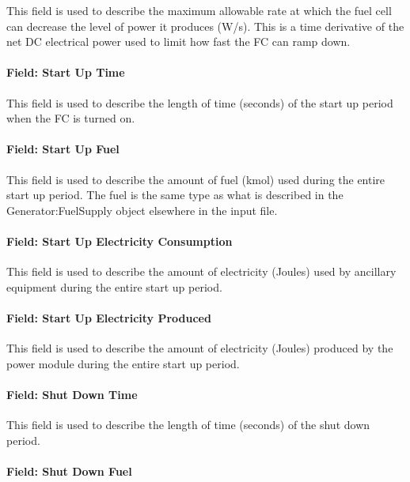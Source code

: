 This field is used to describe the maximum allowable rate at which the fuel cell can decrease the level of power it produces (W/s). This is a time derivative of the net DC electrical power used to limit how fast the FC can ramp down.

\paragraph{Field: Start Up Time}\label{field-start-up-time}

This field is used to describe the length of time (seconds) of the start up period when the FC is turned on.

\paragraph{Field: Start Up Fuel}\label{field-start-up-fuel}

This field is used to describe the amount of fuel (kmol) used during the entire start up period. The fuel is the same type as what is described in the Generator:FuelSupply object elsewhere in the input file.

\paragraph{Field: Start Up Electricity Consumption}\label{field-start-up-electricity-consumption}

This field is used to describe the amount of electricity (Joules) used by ancillary equipment during the entire start up period.

\paragraph{Field: Start Up Electricity Produced}\label{field-start-up-electricity-produced}

This field is used to describe the amount of electricity (Joules) produced by the power module during the entire start up period.

\paragraph{Field: Shut Down Time}\label{field-shut-down-time}

This field is used to describe the length of time (seconds) of the shut down period.

\paragraph{Field: Shut Down Fuel}\label{field-shut-down-fuel}

